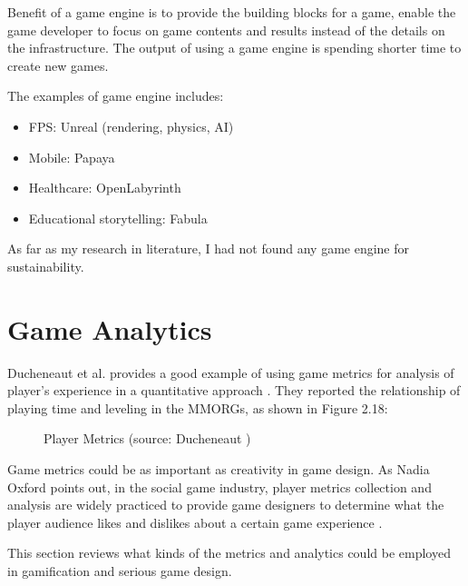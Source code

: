 Benefit of a game engine is to provide the building blocks for a game, enable the game developer to focus on game contents and results instead of the details on the infrastructure. The output of using a game engine is spending shorter time to create new games.

The examples of game engine includes:
\begin {itemize}
    \item FPS: Unreal (rendering, physics, AI)
    \item Mobile: Papaya
    \item Healthcare: OpenLabyrinth
    \item Educational storytelling: Fabula
\end {itemize}

As far as my research in literature, I had not found any game engine for sustainability.

\section{Game Analytics}

Ducheneaut et al. provides a good example of 
using game metrics for analysis of player's experience in a quantitative approach \cite {ducheneaut2006alone}. They reported the relationship of playing time and leveling in the MMORGs, as shown in Figure 2.18:

\begin{figure}[htbp]
	\centering
		\caption{Player Metrics (source: Ducheneaut \cite{ducheneaut2006alone})}
		\label{fig:player-metrics}
\end{figure}

Game metrics could be as important as creativity in game design. As Nadia Oxford points out, in the social game industry, player metrics collection and analysis are widely practiced to provide game designers to determine what the player audience likes and dislikes about a certain game experience \cite {Oxford2010}. 

This section reviews what kinds of the metrics and analytics could be employed in gamification and serious game design.

